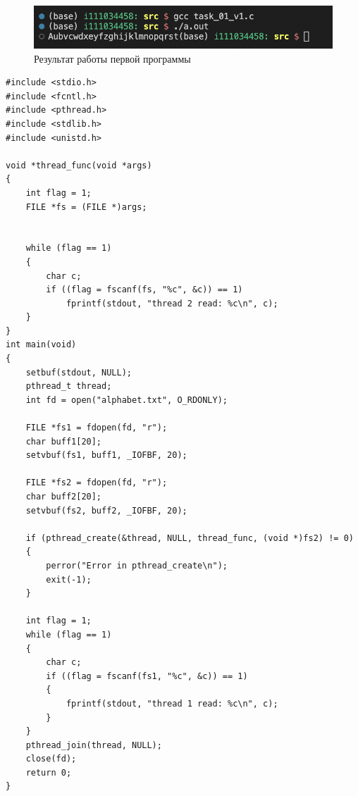 \begin{figure}[H]
	\centering
	\includegraphics[scale=0.8]{inc/img/task_01_v1.png}
	\caption{Результат работы первой программы}
	\label{fig:prog_01}
\end{figure}

\begin{center}
\captionsetup{justification=raggedright,singlelinecheck=off}
\begin{lstlisting}[label=lst:add,caption=Первая программа (реализация с потоками)]
#include <stdio.h>
#include <fcntl.h>
#include <pthread.h>
#include <stdlib.h>
#include <unistd.h>

void *thread_func(void *args)
{
    int flag = 1;
    FILE *fs = (FILE *)args;


    while (flag == 1)
    {
        char c;
        if ((flag = fscanf(fs, "%c", &c)) == 1)
            fprintf(stdout, "thread 2 read: %c\n", c);
    }
}
int main(void)
{
    setbuf(stdout, NULL);
    pthread_t thread;
    int fd = open("alphabet.txt", O_RDONLY);

    FILE *fs1 = fdopen(fd, "r");
    char buff1[20];
    setvbuf(fs1, buff1, _IOFBF, 20);

    FILE *fs2 = fdopen(fd, "r");
    char buff2[20];
    setvbuf(fs2, buff2, _IOFBF, 20);

    if (pthread_create(&thread, NULL, thread_func, (void *)fs2) != 0)
	{
		perror("Error in pthread_create\n");
		exit(-1);
	}
	
    int flag = 1;
    while (flag == 1)
    {
        char c;
        if ((flag = fscanf(fs1, "%c", &c)) == 1)
        {
            fprintf(stdout, "thread 1 read: %c\n", c);
        }
    }
    pthread_join(thread, NULL);
    close(fd);
    return 0;
}
\end{lstlisting}
\end{center}


